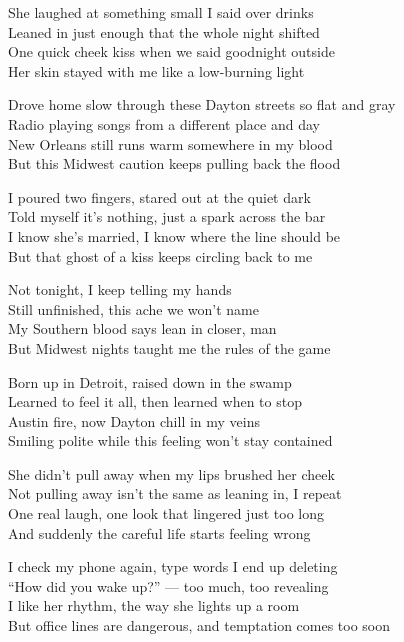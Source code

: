 \begin{lyrics}

She laughed at something small I said over drinks\\
Leaned in just enough that the whole night shifted\\
One quick cheek kiss when we said goodnight outside\\
Her skin stayed with me like a low-burning light

Drove home slow through these Dayton streets so flat and gray\\
Radio playing songs from a different place and day\\
New Orleans still runs warm somewhere in my blood\\
But this Midwest caution keeps pulling back the flood

I poured two fingers, stared out at the quiet dark\\
Told myself it’s nothing, just a spark across the bar\\
I know she’s married, I know where the line should be\\
But that ghost of a kiss keeps circling back to me

Not tonight, I keep telling my hands\\
Still unfinished, this ache we won’t name\\
My Southern blood says lean in closer, man\\
But Midwest nights taught me the rules of the game

Born up in Detroit, raised down in the swamp\\
Learned to feel it all, then learned when to stop\\
Austin fire, now Dayton chill in my veins\\
Smiling polite while this feeling won’t stay contained

She didn’t pull away when my lips brushed her cheek\\
Not pulling away isn’t the same as leaning in, I repeat\\
One real laugh, one look that lingered just too long\\
And suddenly the careful life starts feeling wrong

I check my phone again, type words I end up deleting\\
“How did you wake up?” — too much, too revealing\\
I like her rhythm, the way she lights up a room\\
But office lines are dangerous, and temptation comes too soon


\end{lyrics}
